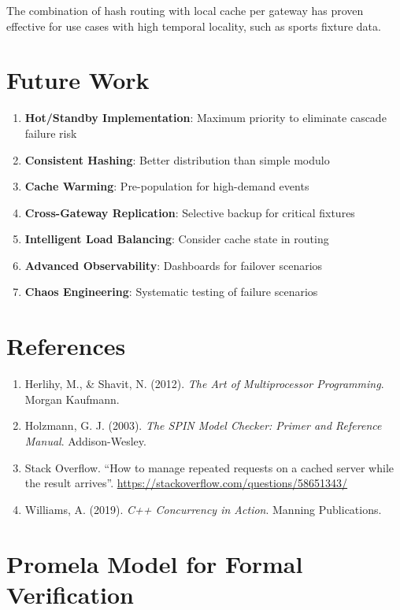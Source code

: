 \documentclass[11pt,a4paper]{article}
\begin{document}
The combination of hash routing with local cache per gateway has proven
effective for use cases with high temporal locality, such as sports
fixture data.

\section{Future Work}

\begin{enumerate}
\item \textbf{Hot/Standby Implementation}: Maximum priority to eliminate cascade failure risk
\item \textbf{Consistent Hashing}: Better distribution than simple modulo
\item \textbf{Cache Warming}: Pre-population for high-demand events
\item \textbf{Cross-Gateway Replication}: Selective backup for critical fixtures
\item \textbf{Intelligent Load Balancing}: Consider cache state in routing
\item \textbf{Advanced Observability}: Dashboards for failover scenarios
\item \textbf{Chaos Engineering}: Systematic testing of failure scenarios
\end{enumerate}

\section{References}

\begin{enumerate}
\item Herlihy, M., \& Shavit, N. (2012). \emph{The Art of Multiprocessor
      Programming}. Morgan Kaufmann.
\item Holzmann, G. J. (2003). \emph{The SPIN Model Checker: Primer and
      Reference Manual}. Addison-Wesley.
\item Stack Overflow. ``How to manage repeated requests on a cached
      server while the result
      arrives''. \url{https://stackoverflow.com/questions/58651343/}
\item Williams, A. (2019). \emph{C++ Concurrency in Action}. Manning
      Publications.
\end{enumerate}

\newpage

\appendix

\section{Promela Model for Formal Verification}
\end{document}
